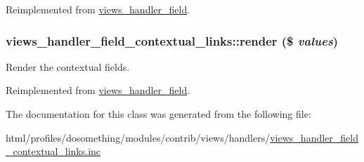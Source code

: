 Reimplemented from \hyperlink{classviews__handler__field_a4f661f91bcbe80d4a00c30a31456c502}{views\_\-handler\_\-field}.\hypertarget{classviews__handler__field__contextual__links_a846ef1ba2d278ef6a251bc7fbfa150cb}{
\subsubsection[{render}]{\setlength{\rightskip}{0pt plus 5cm}views\_\-handler\_\-field\_\-contextual\_\-links::render (\$ {\em values})}}
\label{classviews__handler__field__contextual__links_a846ef1ba2d278ef6a251bc7fbfa150cb}
Render the contextual fields. 

Reimplemented from \hyperlink{classviews__handler__field_a82ff951c5e9ceb97b2eab86f880cbc1e}{views\_\-handler\_\-field}.

The documentation for this class was generated from the following file:\begin{DoxyCompactItemize}
\item 
html/profiles/dosomething/modules/contrib/views/handlers/\hyperlink{views__handler__field__contextual__links_8inc}{views\_\-handler\_\-field\_\-contextual\_\-links.inc}\end{DoxyCompactItemize}
